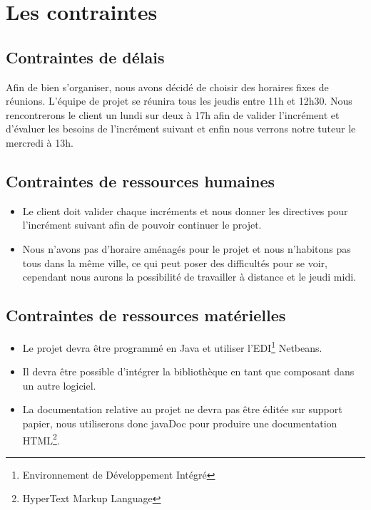 \documentclass[12pt,a4paper,openany]{article}
\begin{document}
	\section{Les contraintes}
	\subsection{Contraintes de délais}
	Afin de bien s'organiser, nous avons décidé de choisir des horaires fixes de réunions. L'équipe de projet se réunira tous
	les jeudis entre 11h et 12h30. Nous rencontrerons le client un lundi sur deux à 17h afin de valider l'incrément et d'évaluer les
	besoins de l'incrément suivant et enfin nous verrons notre 
	tuteur le mercredi à 13h.\\

	\subsection{Contraintes de ressources humaines}
	\begin{itemize}
		\item Le client doit valider chaque incréments et nous donner les directives pour l'incrément suivant afin de pouvoir continuer le projet. 
		\item Nous n'avons pas d'horaire aménagés pour le projet et nous n'habitons pas tous dans la même ville, ce qui peut poser des difficultés pour se voir, cependant nous aurons la possibilité de travailler à distance et le jeudi midi.
	\end{itemize}
	\subsection{Contraintes de ressources matérielles}
	\begin{itemize}
		\item Le projet devra être programmé en Java et utiliser l'EDI\footnote{Environnement de Développement Intégré} Netbeans. 
		\item Il devra être possible d'intégrer la bibliothèque en tant que composant dans un autre logiciel. 
		\item La documentation relative au projet ne devra pas être éditée sur support papier, nous utiliserons donc javaDoc pour produire une documentation 
	HTML\footnote{HyperText Markup Language}.  
	\end{itemize}
	
\end{document}
